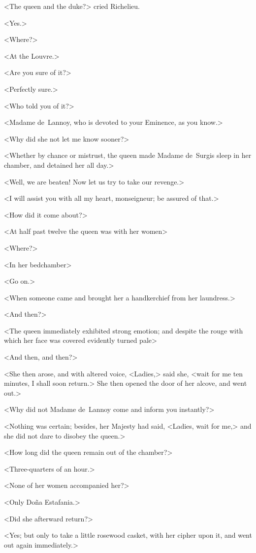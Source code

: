 <The queen and the duke?> cried Richelieu. 

<Yes.> 

<Where?> 

<At the Louvre.> 

<Are you sure of it?> 

<Perfectly sure.> 

<Who told you of it?> 

<Madame de~Lannoy, who is devoted to your Eminence, as you know.> 

<Why did she not let me know sooner?> 

<Whether by chance or mistrust, the queen made Madame de~Surgis sleep in her chamber, and detained her all day.> 

<Well, we are beaten! Now let us try to take our revenge.> 

<I will assist you with all my heart, monseigneur; be assured of that.> 

<How did it come about?> 

<At half past twelve the queen was with her women\longdash> 

<Where?> 

<In her bedchamber\longdash> 

<Go on.> 

<When someone came and brought her a handkerchief from her laundress.> 

<And then?> 

<The queen immediately exhibited strong emotion; and despite the rouge with which her face was covered evidently turned pale\longdash> 

<And then, and then?> 

<She then arose, and with altered voice, <Ladies,> said she, <wait for me ten minutes, I shall soon return.> She then opened the door of her alcove, and went out.> 

<Why did not Madame de~Lannoy come and inform you instantly?> 

<Nothing was certain; besides, her Majesty had said, <Ladies, wait for me,> and she did not dare to disobey the queen.> 

<How long did the queen remain out of the chamber?> 

<Three-quarters of an hour.> 

<None of her women accompanied her?> 

<Only Doña Estafania.> 

<Did she afterward return?> 

<Yes; but only to take a little rosewood casket, with her cipher upon it, and went out again immediately.> 

